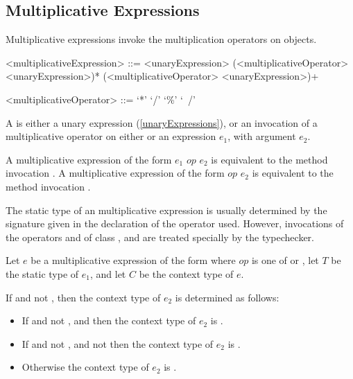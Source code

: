 \documentclass[makeidx]{article}
\begin{document}
{\subsection{Multiplicative Expressions}

\LMHash{}%
Multiplicative expressions invoke the multiplication operators on objects.

\begin{grammar}
<multiplicativeExpression> ::= \gnewline{}
  <unaryExpression> (<multiplicativeOperator> <unaryExpression>)*
  \alt \SUPER{} (<multiplicativeOperator> <unaryExpression>)+

<multiplicativeOperator> ::= `*'
  \alt `/'
  \alt `\%'
  \alt `~/'
\end{grammar}

\LMHash{}%
A  is either a unary expression
(\ref{unaryExpressions}),
or an invocation of a multiplicative operator
on either \SUPER{} or an expression $e_1$,
with argument $e_2$.

\LMHash{}%
A multiplicative expression of the form $e_1$ $op$ $e_2$ is equivalent to
the method invocation .
A multiplicative expression of the form \SUPER{} $op$ $e_2$ is equivalent to
the method invocation .

\LMHash{}%
The static type of an multiplicative expression is usually determined
by the signature given in the declaration of the operator used.
However, invocations of the operators \code{*} and \code{\%} of
class ,  and 
are treated specially by the typechecker.

\LMHash{}%
Let $e$ be a multiplicative expression of the form 
where $op$ is one of \code{*} or \code{\%},
let $T$ be the static type of $e_1$,
and let $C$ be the context type of $e$.

If  and not , then
the context type of $e_2$ is determined as follows:

\begin{itemize}
  \item{} If  and not ,
      and 
      then the context type of $e_2$ is .
  \item{} If  and not ,
      and not 
     then the context type of $e_2$ is .
  \item{} Otherwise the context type of $e_2$ is .
\end{itemize}

}
\end{document}
